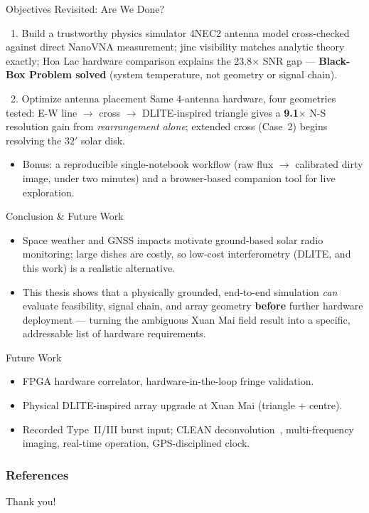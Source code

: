 \documentclass{beamer}
\newcounter{sframe}[section]
\renewcommand{\thesframe}{\thesection.\arabic{sframe}}
\newcommand{\ftitle}[1]{\stepcounter{sframe}{\normalsize\thesframe}\quad #1}
\newcommand{\cmark}{\ding{51}}
\begin{document}
\begin{frame}{\ftitle{Objectives Revisited: Are We Done?}}
\begin{block}{\cmark\ 1. Build a trustworthy physics simulator}
\footnotesize
4NEC2 antenna model cross-checked against direct NanoVNA measurement;
jinc visibility matches analytic theory exactly; Hoa Lac hardware
comparison explains the 23.8$\times$ SNR gap --- \textbf{Black-Box
Problem solved} (system temperature, not geometry or signal chain).
\end{block}
\vspace{4pt}
\begin{block}{\cmark\ 2. Optimize antenna placement}
\footnotesize
Same 4-antenna hardware, four geometries tested: E-W line
$\to$ cross $\to$ DLITE-inspired triangle gives a
\textbf{9.1$\times$} N-S resolution gain from \emph{rearrangement alone};
extended cross (Case~2) begins resolving the $32'$ solar disk.
\end{block}
\vspace{4pt}
\begin{itemize}
  \footnotesize
  \item Bonus: a reproducible single-notebook workflow (raw flux $\to$
  calibrated dirty image, under two minutes) and a browser-based
  companion tool for live exploration.
\end{itemize}
\end{frame}

\begin{frame}{\ftitle{Conclusion \& Future Work}}
\begin{itemize}
  \item Space weather and GNSS impacts motivate ground-based solar radio
  monitoring; large dishes are costly, so low-cost interferometry (DLITE,
  and this work) is a realistic alternative.
  \item This thesis shows that a physically grounded, end-to-end
  simulation \emph{can} evaluate feasibility, signal chain, and array
  geometry \textbf{before} further hardware deployment --- turning the
  ambiguous Xuan Mai field result into a specific, addressable list of
  hardware requirements.
\end{itemize}
\begin{block}{Future Work}
\footnotesize
\begin{itemize}
  \item FPGA hardware correlator, hardware-in-the-loop fringe validation.
  \item Physical DLITE-inspired array upgrade at Xuan Mai (triangle + centre).
  \item Recorded Type~II/III burst input; CLEAN
  deconvolution~\cite{hogbom1974}, multi-frequency imaging, real-time
  operation, GPS-disciplined clock.
\end{itemize}
\end{block}
\end{frame}

\begin{frame}[allowframebreaks]
\frametitle{References}
\tiny{

}
\end{frame}

\begin{frame}
\Huge{\centerline{Thank you!}}
\end{frame}
\end{document}
